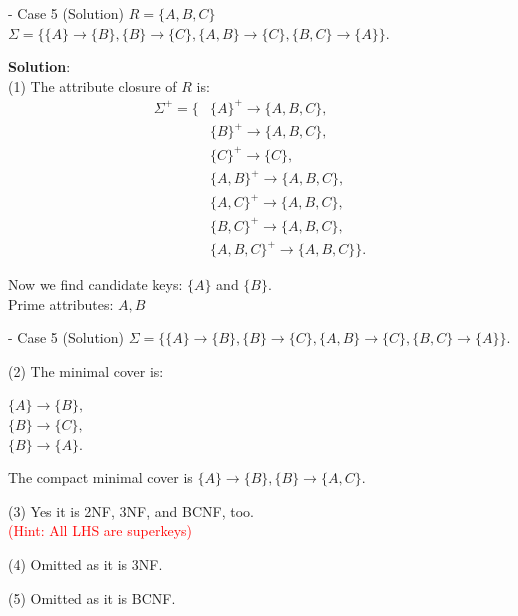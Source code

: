 \begin{frame}[fragile]{ - Case 5 (Solution)}
	$R=\{A, B, C\}$\\ 
	$\Sigma=\{\{A\} \rightarrow \{B\},\{B\} \rightarrow \{C\}, \{A, B\} \rightarrow \{C\},\{B, C\} \rightarrow \{A\}\}.$\\\vspace{5pt}
	
	\textbf{Solution}:\\
	(1) The attribute closure of $R$ is:
	\begin{align*} 
		\Sigma^{+} = \{&\{A\}^{+} \rightarrow \{A,B,C\},\\
		&\{B\}^{+} \rightarrow \{A,B,C\},\\
		&\{C\}^{+} \rightarrow \{C\},\\
		&\{A,B\}^{+} \rightarrow \{A,B,C\},\\
		&\{A,C\}^{+} \rightarrow \{A,B,C\},\\
		&\{B,C\}^{+} \rightarrow \{A,B,C\},\\
		&\{A,B,C\}^{+} \rightarrow \{A,B,C\}\}.
	\end{align*} 
	
	Now we find candidate keys: $\{A\}$ and $\{B\}$.\\
	Prime attributes: $A, B$
\end{frame}

\begin{frame}[fragile]{ - Case 5 (Solution)}
	$\Sigma=\{\{A\} \rightarrow \{B\},\{B\} \rightarrow \{C\}, \{A, B\} \rightarrow \{C\},\{B, C\} \rightarrow \{A\}\}.$\\\vspace{25pt}
	
	(2) The minimal cover is:\\\vspace{5pt}
	
	$\{A\} \rightarrow \{B\},$\\
	$\{B\}  \rightarrow \{C\},$\\
	$\{B\} \rightarrow \{A\}.$\\\vspace{5pt}
	
	The compact minimal cover is $\{A\} \rightarrow \{B\}, \{B\}  \rightarrow \{A,C\}$.\\\vspace{5pt}
	
	(3)  Yes it is 2NF, 3NF, and BCNF, too.\\\vspace{2pt}
	\textcolor{red}{(Hint: All LHS are superkeys)}\\\vspace{5pt}
	
	(4) Omitted as it is 3NF. \\\vspace{5pt}
	
	(5) Omitted as it is BCNF. \\\vspace{5pt}
	
\end{frame}

